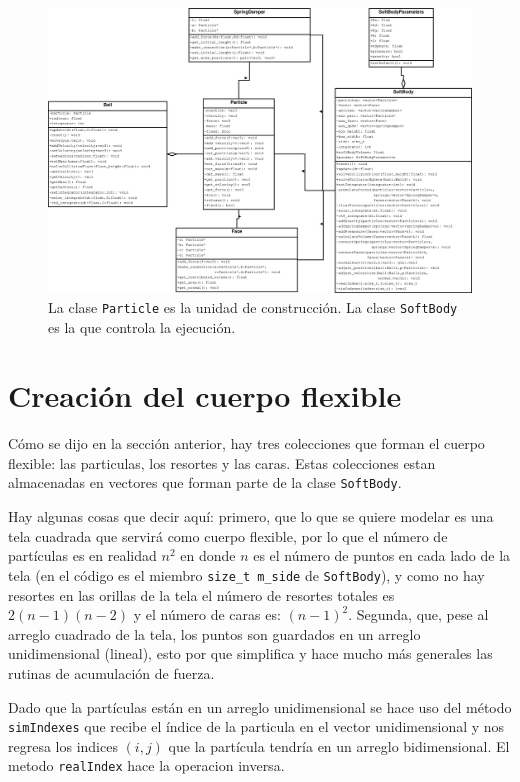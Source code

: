 \begin{figure}
 \centering
 \includegraphics[width=\textwidth]{Img/03/diagramaClases}
 \caption[Diagrama de clases]{ 
 La clase \texttt{Particle} es la unidad de construcción. La clase \texttt{SoftBody} es la que controla la ejecución. 
 } \label{clases:fig}
\end{figure}

\section{Creación del cuerpo flexible}

Cómo se dijo en la sección anterior, hay tres colecciones que forman el cuerpo flexible: las particulas, los resortes y las caras. Estas colecciones estan almacenadas en vectores que forman parte de la clase \texttt{SoftBody}.

Hay algunas cosas que decir aquí: primero, que lo que se quiere modelar es una tela cuadrada que servirá como cuerpo flexible, por lo que el número de partículas es en realidad $n^{2}$ en donde $n$ es el número de puntos en cada lado de la tela (en el código es el miembro \texttt{size_t m_side} de \texttt{SoftBody}), y como no hay resortes en las orillas de la tela el número de resortes totales es $2 (n - 1) (n - 2)$ y el número de caras es: $(n-1)^{2}$.
Segunda, que, pese al arreglo cuadrado de la tela, los puntos son guardados en un arreglo unidimensional (lineal), esto por que simplifica y hace mucho más generales las rutinas de acumulación de fuerza.

Dado que la partículas están en un arreglo unidimensional se hace uso del método \texttt{simIndexes} que recibe el índice de la particula en el vector unidimensional y nos regresa los indices $(i, j)$ que la partícula tendría en un arreglo bidimensional. El metodo \texttt{realIndex} hace la operacion inversa.

